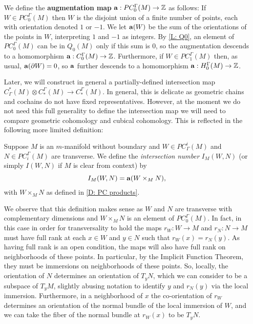 \begin{definition}\label{D: aug}
We define the \textbf{augmentation map} $\mathbf{a}:PC^\Gamma_0(M)\to \mathbb{Z}$ as follows: If $W\in PC^\Gamma_0(M)$ then $W$ is the disjoint union of a finite number of points, each with orientation denoted $1$ or $-1$. We let $\mathbf{a}(W)$ be the sum of the orientations of the points in $W$, interpreting $1$ and $-1$ as integers.  By \cref{L: Q0}, an element of $PC^\Gamma_0(M)$ can be in $Q_0(M)$ only if this sum is $0$, so the augmentation descends to a homomorphism $\mathbf{a}:C^\Gamma_0(M)\to \mathbb{Z}$. Furthermore, if $W\in PC_1^\Gamma(M)$ then, as usual, $\mathbf{a}(\partial W)=0$, so $\mathbf{a}$ further descends to a homomorphism $\mathbf{a}:H_0^\Gamma(M)\to \mathbb{Z}$. 
\end{definition}

Later, we will construct in general a partially-defined intersection map $C^*_\Gamma(M)\otimes C_*^\Gamma(M)\to C_*^\Gamma(M)$. In general, this is delicate as geometric chains and cochains do not have fixed representatives. However, at the moment we do not need this full generality to define the intersection map we will need to compare geometric cohomology and cubical cohomology. This is reflected in the following more limited definition:


\begin{definition}\label{D: intersection number}
Suppose $M$ is an $m$-manifold without boundary and $W\in PC_\Gamma^i(M)$ and $N\in PC_{i}^\Gamma(M)$ are transverse. We define the \textit{intersection number} $I_M(W,N)$ (or simply $I(W,N)$ if $M$ is clear from context) by $$I_M(W,N)=\mathbf{a}(W \times_M N),$$ with $W\times_MN$ as defined in \cref{D: PC products}. 
\end{definition}



We observe that this definition makes sense as $W$ and $N$ are transverse with complementary dimensions and $W\times_MN$ is an element of $PC_0^\Gamma(M)$. In fact, in this case in order for transversality to hold the maps $r_W:W\to M$ and $r_N:N\to M$ must have full rank at each $x\in W$ and $y\in N$ such that $r_W(x)=r_N(y)$. As having full rank is an open condition, the maps will also have full rank on neighborhoods of these points. In particular, by the Implicit Function Theorem, they must be immersions on neighborhoods of these points. So, locally, the orientation of $N$ determines an orientation of $T_yN$, which we can consider to be a subspace of $T_{y}M$, slightly abusing notation to identify $y$ and $r_N(y)$ via the local immersion. Furthermore, in a neighborhood of $x$ the co-orientation of $r_W$ determines an orientation of the normal bundle of the local immersion of $W$, and we can take the fiber of the normal bundle at $r_W(x)$ to be $T_yN$. 

